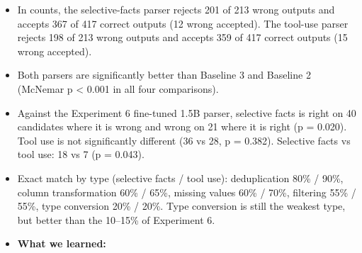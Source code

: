 \documentclass[11pt]{article}
\providecommand{\tightlist}{\setlength{\itemsep}{0pt}\setlength{\parskip}{0pt}}
\begin{document}
\begin{itemize}
\tightlist
\item
  In counts, the selective-facts parser rejects 201 of 213 wrong outputs
  and accepts 367 of 417 correct outputs (12 wrong accepted). The
  tool-use parser rejects 198 of 213 wrong outputs and accepts 359 of
  417 correct outputs (15 wrong accepted).
\item
  Both parsers are significantly better than Baseline 3 and Baseline 2
  (McNemar p \textless{} 0.001 in all four comparisons).
\item
  Against the Experiment 6 fine-tuned 1.5B parser, selective facts is
  right on 40 candidates where it is wrong and wrong on 21 where it is
  right (p = 0.020). Tool use is not significantly different (36 vs 28,
  p = 0.382). Selective facts vs tool use: 18 vs 7 (p = 0.043).
\item
  Exact match by type (selective facts / tool use): deduplication 80\% /
  90\%, column transformation 60\% / 65\%, missing values 60\% / 70\%,
  filtering 55\% / 55\%, type conversion 20\% / 20\%. Type conversion is
  still the weakest type, but better than the 10--15\% of Experiment 6.
\item
  \textbf{What we learned:}


\end{itemize}
\end{document}
